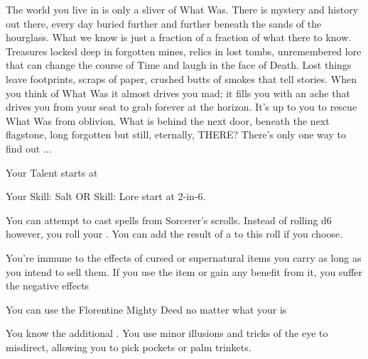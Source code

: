 {  



  The world you live in is only a sliver of What Was.  There is mystery and history out there, every day buried further and further beneath the sands of the hourglass.  What we know is just a fraction of a fraction of what there  to know.  Treasures locked deep in forgotten mines, relics in lost tombs, unremembered lore that can change the course of Time and laugh in the face of Death.  Lost things leave footprints, scraps of paper, crushed butts of smokes that tell stories.  When you think of What Was it almost drives you mad; it fills you with an ache that drives you from your seat to grab forever at the horizon.  It's up to you to rescue What Was from oblivion. What is behind the next door, beneath the next flagstone, long forgotten but still, eternally, THERE?    There's only one way to find out ...





  Your Talent starts at \DCUP

  Your Skill: Salt OR Skill: Lore start at 2-in-6. 


  You can attempt to cast spells from Sorcerer's scrolls.  Instead of rolling d6 however, you roll your \KNAVE.  You can add the result of a \LUCK to this roll if you choose.

  You're immune to the effects of cursed or supernatural items you carry as long as you intend to sell them.  If you use the item or gain any benefit from it, you suffer the negative effects

  You can use the Florentine Mighty Deed no matter what your \DEX is

  You know the additional .  You use minor illusions and tricks of the eye to misdirect, allowing you to pick pockets or palm trinkets. 

}

